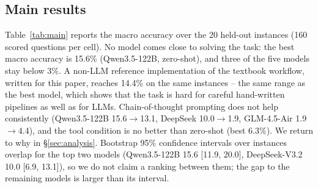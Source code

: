 \documentclass[10pt]{article}
\begin{document}
\subsection{Main results}
Table~\ref{tab:main} reports the macro accuracy over the 20 held-out instances (160 scored
questions per cell). No model comes close to solving the task: the best macro accuracy is
15.6\% (Qwen3.5-122B, zero-shot), and three of the five models stay below 3\%. A non-LLM
reference implementation of the textbook workflow, written for this paper, reaches 14.4\%
on the same instances -- the same range as the best model, which shows that the task is hard
for careful hand-written pipelines as well as for LLMs. Chain-of-thought prompting does not
help consistently (Qwen3.5-122B 15.6$\to$13.1, DeepSeek 10.0$\to$1.9, GLM-4.5-Air
1.9$\to$4.4), and the tool condition is no better than zero-shot (best 6.3\%). We return to
why in \S\ref{sec:analysis}. Bootstrap 95\% confidence intervals over instances overlap for
the top two models (Qwen3.5-122B 15.6 [11.9, 20.0], DeepSeek-V3.2 10.0 [6.9, 13.1]), so we do
not claim a ranking between them; the gap to the remaining models is larger than its interval.
\end{document}

